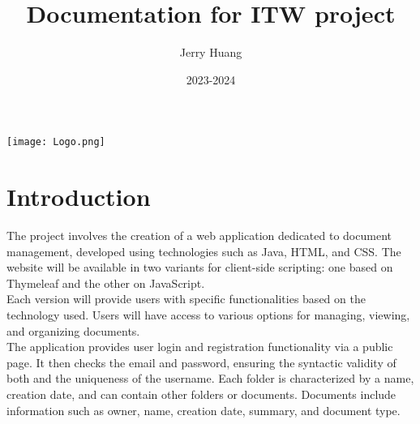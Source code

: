 \documentclass[a4paper,12pt]{article}
\title{Documentation for ITW project}
\author{Jerry Huang}
\date{2023-2024}
\begin{document}
\maketitle
\begin{center}
\texttt{[image: Logo.png]}
\end{center}
\newpage
\tableofcontents
\listoffigures

\newpage


\section{Introduction}

The project involves the creation of a web application dedicated to document management, developed using technologies such as Java, HTML, and CSS. The website will be available in two variants for client-side scripting: one based on Thymeleaf and the other on JavaScript.\\ Each version will provide users with specific functionalities based on the technology used. Users will have access to various options for managing, viewing, and organizing documents.\\ The application provides user login and registration functionality via a public page. It then checks the email and password, ensuring the syntactic validity of both and the uniqueness of the username. Each folder is characterized by a name, creation date, and can contain other folders or documents. Documents include information such as owner, name, creation date, summary, and document type. 
\end{document}
